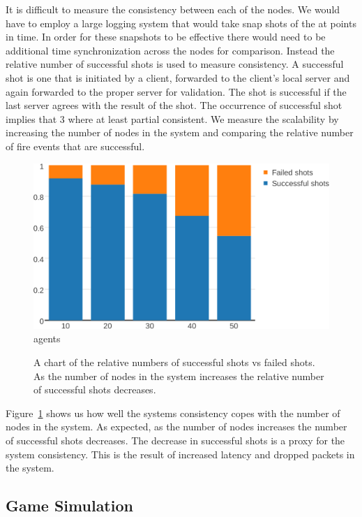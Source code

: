 It is difficult to measure the consistency between each of the nodes. 
We would have to employ a large logging system that would take snap shots of the \gamestate at points in time. 
In order for these snapshots to be effective there would need to be additional time synchronization across the nodes for comparison. 
Instead the relative number of successful shots is used to measure consistency. 
A successful shot is one that is initiated by a client, forwarded to the client's local server and again forwarded to the proper server for validation. 
The shot is successful if the last server agrees with the result of the shot. 
The occurrence of successful shot implies that $3$ \gamestates where at least partial consistent.
We measure the scalability by increasing the number of nodes in the system and comparing the relative number of fire events that are successful. 
	\begin{figure}[ht]
	\centering
		\includegraphics[width=0.95\linewidth]{../images/agents-vs-consistency-via-shots-crop.pdf}
		agents
		\caption{\label{figure:nodes-vs-shots-consistency} A chart of the relative numbers of successful shots vs failed shots. As the number of nodes in the system increases the relative number of successful shots decreases.}
	\end{figure}
Figure~\ref{figure:nodes-vs-shots-consistency} shows us how well the systems consistency copes with the number of nodes in the system. As expected, as the number of nodes increases the number of successful shots decreases. The decrease in successful shots is a proxy for the system consistency. 
This is the result of increased latency and dropped packets in the system. 

\subsection{Game Simulation}

